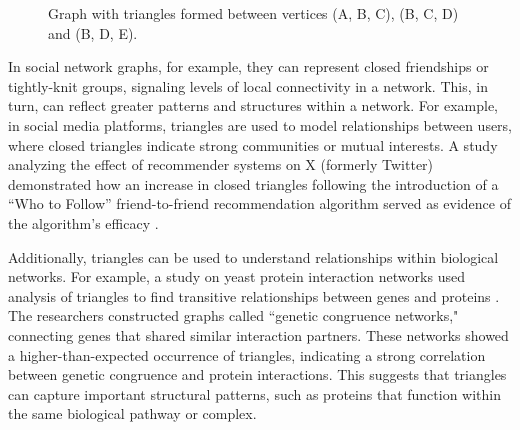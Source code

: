 \documentclass[11pt, margin=1in]{article}
\begin{document}
\begin{figure}[H]
    \centering
    \begin{minipage}{0.45\textwidth}
        \caption{Graph with triangles formed between vertices (A, B, C), (B, C, D) and (B, D, E).}
        \label{fig:triangles}
    \end{minipage}%
\end{figure}

In social network graphs, for example, they can represent closed friendships or tightly-knit groups, signaling levels of local connectivity in a network.
This, in turn, can reflect greater patterns and structures within a network.
For example, in social media platforms, triangles are used to model relationships between users, where closed triangles indicate strong communities or mutual interests.
A study analyzing the effect of recommender systems on X (formerly Twitter) demonstrated how an increase in closed triangles following the introduction of a ``Who to Follow'' friend-to-friend recommendation algorithm served as evidence of the algorithm's efficacy \cite{su_effect_2016}.

Additionally, triangles can be used to understand relationships within biological networks.
For example, a study on yeast protein interaction networks used analysis of triangles to find transitive relationships between genes and proteins \cite{ye_commensurate_2005}.
The researchers constructed graphs called ``genetic congruence networks," connecting genes that shared similar interaction partners.
These networks showed a higher-than-expected occurrence of triangles, indicating a strong correlation between genetic congruence and protein interactions.
This suggests that triangles can capture important structural patterns, such as proteins that function within the same biological pathway or complex.
\end{document}
